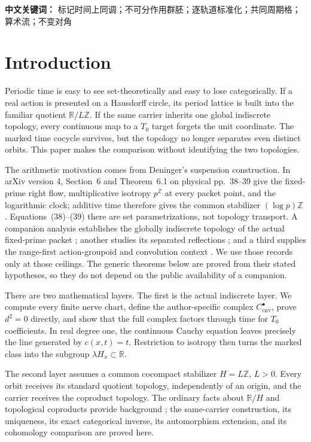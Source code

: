 \documentclass[11pt]{article}
\theoremstyle{definition}
\newcommand{\R}{\mathbb R}
\newcommand{\Z}{\mathbb Z}
\newcommand{\Ccnv}{C_{\mathrm{cnv}}}
\begin{document}
\medskip
\noindent\textbf{中文关键词：} 标记时间上同调；不可分作用群胚；逐轨道标准化；共同周期格；算术流；不变对角

\tableofcontents

\section{Introduction}
\label{sec:introduction}

Periodic time is easy to see set-theoretically and easy to lose
categorically.  If a real action is presented on a Hausdorff circle, its
period lattice is built into the familiar quotient $\R/L\Z$.  If the same
carrier inherits one global indiscrete topology, every continuous map to a
$T_0$ target forgets the unit coordinate.  The marked time cocycle survives,
but the topology no longer separates even distinct orbits.  This paper makes
the comparison without identifying the two topologies.

The arithmetic motivation comes from Deninger's suspension construction.
In arXiv version 4, Section~6 and Theorem~6.1 on physical
pp.~38--39 give the fixed-prime right flow, multiplicative isotropy $p^{\Z}$
at every packet point, and the logarithmic clock; additive time therefore
gives the common stabilizer $(\log p)\Z$ \cite{Deninger2026Dynamical}.
Equations~(38)--(39) there are set parametrizations, not topology transport.
A companion analysis establishes the globally indiscrete topology of the
actual fixed-prime packet \cite{Wang2026PacketSeparation}; another studies
its separated reflections \cite{Wang2026SeparatedReflections}; and a third
supplies the range-first action-groupoid and convolution context
\cite{Wang2026ContinuousConvolution}.  We use those records only at those
ceilings.  The generic theorems below are proved from their stated
hypotheses, so they do not depend on the public availability of a companion.

There are two mathematical layers.  The first is the actual indiscrete
layer.  We compute every finite nerve chart, define the author-specific
complex $\Ccnv^\bullet$, prove $d^2=0$ directly, and show that the full
complex factors through time for $T_0$ coefficients.  In real degree one,
the continuous Cauchy equation leaves precisely the line generated by
$c(x,t)=t$.  Restriction to isotropy then turns the marked class into the
subgroup $\lambda H_x\subset\R$.

The second layer assumes a common cocompact stabilizer $H=L\Z$, $L>0$.
Every orbit receives its standard quotient topology, independently of an
origin, and the carrier receives the coproduct topology.  The ordinary
facts about $\R/H$ and topological coproducts provide background
\cite{EoMTopologicalGroup,EoMHomogeneousSpace,Stacks0B1W}; the same-carrier
construction, its uniqueness, its exact categorical inverse, its
automorphism extension, and its cohomology comparison are proved here.
\end{document}
